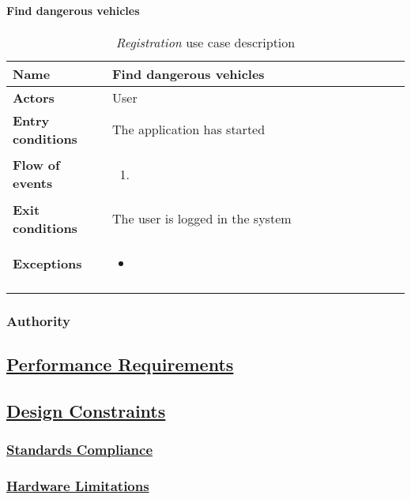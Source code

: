 		\paragraph{Find dangerous vehicles}
		\begin{longtable}{p{0.25\linewidth}p{0.75\linewidth}}
			\toprule
			\textbf{Name} & \textbf{Find dangerous vehicles} \\
			\midrule
			\textbf{Actors} & User \\
			\midrule
			\textbf{Entry conditions} & The application has started \\
			\midrule
			\textbf{Flow of events} & 
			\begin{enumerate}
				\item 
			\end{enumerate} \\
			\midrule
			\textbf{Exit conditions} & The user is logged in the system\\
			\midrule
			\textbf{Exceptions} & 
			\begin{itemize}
				\item 		
			\end{itemize} \\
			\bottomrule
			\caption{\emph{Registration} use case description}
		\end{longtable}
		
		
	\subsubsection{Authority}
	
	
\subsection[Performance Requirements]{\hyperlink{toc}{Performance Requirements}}

\subsection[Design Constraints]{\hyperlink{toc}{Design Constraints}}
	\subsubsection[Standards Compliance]{\hyperlink{toc}{Standards Compliance}}
	\subsubsection[Hardware Limitations]{\hyperlink{toc}{Hardware Limitations}}
